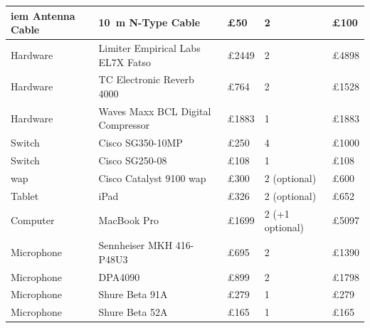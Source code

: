 \begin{longtable}[H]{|p{3cm}|p{4cm}|p{2cm}|p{3cm}|p{2cm}|}
\acrshort{iem} Antenna Cable       & \SI{10}{\metre} N-Type Cable       & £50                           & 2                                  & £100   \\ \hline
Hardware                           & Limiter Empirical Labs EL7X Fatso  & £2449                         & 2                                  & £4898  \\ \hline
Hardware                           & TC Electronic Reverb 4000          & £764                          & 2                                  & £1528  \\ \hline
Hardware                           & Waves Maxx BCL Digital Compressor  & £1883                         & 1                                  & £1883  \\ \hline
\rowcolor[HTML]{EFEFEF} 
Switch                             & Cisco SG350-10MP                   & £250                          & 4                                  & £1000  \\ \hline
\rowcolor[HTML]{EFEFEF} 
Switch                             & Cisco SG250-08                     & £108                          & 1                                  & £108   \\ \hline
\rowcolor[HTML]{EFEFEF} 
\acrshort{wap}                     & Cisco Catalyst 9100 \acrshort{wap} & £300                          & 2 (optional)                       & £600   \\ \hline
Tablet                             & iPad                               & £326                          & 2 (optional)                       & £652   \\ \hline
Computer                           & MacBook Pro                        & £1699                         & 2 (+1 optional)                    & £5097  \\ \hline
\rowcolor[HTML]{EFEFEF} 
Microphone                         & Sennheiser MKH 416-P48U3           & £695                          & 2                                  & £1390  \\ \hline
\rowcolor[HTML]{EFEFEF} 
\cellcolor[HTML]{EFEFEF}Microphone & DPA4090                            & £899                          & 2                                  & £1798  \\ \hline
\rowcolor[HTML]{EFEFEF} 
\cellcolor[HTML]{EFEFEF}Microphone & Shure Beta 91A                     & £279                          & 1                                  & £279   \\ \hline
\rowcolor[HTML]{EFEFEF} 
\cellcolor[HTML]{EFEFEF}Microphone & Shure Beta 52A                     & £165                          & 1                                  & £165   \\ \hline

\end{longtable}
